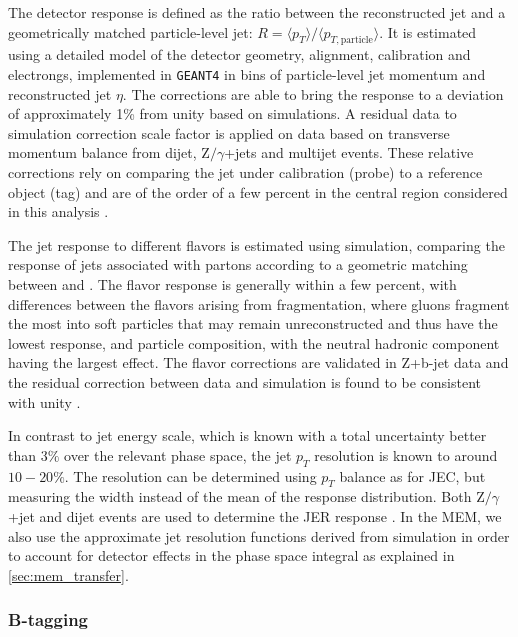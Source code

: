 The detector response is defined as the ratio between the reconstructed jet and a geometrically matched particle-level jet: $R = \langle p_T \rangle / \langle p_{T,\mathrm{particle}} \rangle$. It is estimated using a detailed model of the detector geometry, alignment, calibration and electrongs, implemented in \texttt{GEANT4} in bins of particle-level jet momentum and reconstructed jet $\eta$. The corrections are able to bring the response to a deviation of approximately 1\% from unity based on simulations. A residual data to simulation correction scale factor is applied on data based on transverse momentum balance from dijet, $\mathrm{Z}/\gamma$+jets and multijet events. These relative corrections rely on comparing the jet under calibration (probe) to a reference object (tag) and are of the order of a few percent in the central region considered in this analysis \cite{Chatrchyan:2011ds,cms_jec_2017}.

The jet response to different flavors is estimated using simulation, comparing the response of jets associated with partons according to a geometric matching between \pythia and \herwig. The flavor response is generally within a few percent, with differences between the flavors arising from fragmentation, where gluons fragment the most into soft particles that may remain unreconstructed and thus have the lowest response, and particle composition, with the neutral hadronic component having the largest effect. The flavor corrections are validated in Z+b-jet data and the residual correction between data and simulation is found to be consistent with unity \cite{Chatrchyan:2011ds}.

In contrast to jet energy scale, which is known with a total uncertainty better than $3\%$ over the relevant phase space, the jet $p_T$ resolution is known to around $10-20\%$. The resolution can be determined using $p_T$ balance as for JEC, but measuring the width instead of the mean of the response distribution. Both $\mathrm{Z}/\gamma$+jet and dijet events are used to determine the JER response \cite{Chatrchyan:2011ds}. In the MEM, we also use the approximate jet resolution functions derived from simulation in order to account for detector effects in the phase space integral as explained in \cref{sec:mem_transfer}.

\subsubsection{B-tagging}
\label{sec:object_id_btag}

